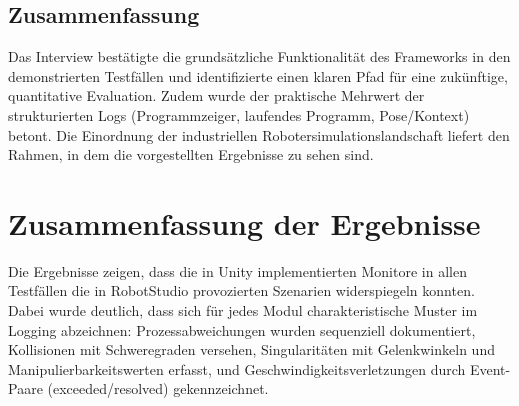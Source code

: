 \subsection{Zusammenfassung}

Das Interview bestätigte die grundsätzliche
Funktionalität des Frameworks in den demonstrierten Testfällen und
identifizierte einen klaren Pfad für eine zukünftige, quantitative Evaluation.
Zudem wurde der praktische Mehrwert der strukturierten Logs (Programmzeiger,
laufendes Programm, Pose/Kontext) betont. Die Einordnung der industriellen
Robotersimulationslandschaft liefert den Rahmen, in dem die vorgestellten Ergebnisse zu
sehen sind.

\section{Zusammenfassung der Ergebnisse}

Die Ergebnisse zeigen, dass die in Unity implementierten Monitore in allen
Testfällen die in RobotStudio provozierten Szenarien widerspiegeln konnten.
Dabei wurde deutlich, dass sich für jedes Modul charakteristische Muster im
Logging abzeichnen: Prozessabweichungen wurden sequenziell dokumentiert,
Kollisionen mit Schweregraden versehen, Singularitäten mit Gelenkwinkeln und
Manipulierbarkeitswerten erfasst, und Geschwindigkeitsverletzungen durch
Event-Paare (exceeded/resolved) gekennzeichnet.\\

